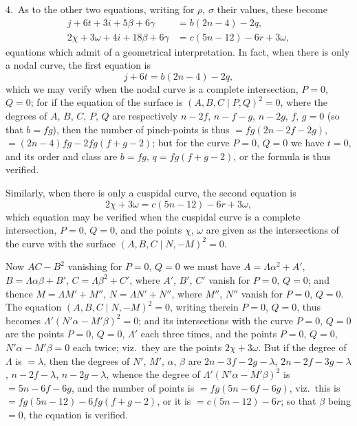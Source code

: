 \documentclass[11pt,a4paper]{article}
\theoremstyle{plain}
\theoremstyle{definition}
\theoremstyle{remark}
\begin{document}
\smallskip

4.\ As to the other two equations, writing for $\rho$, $\sigma$ their values, these become
\begin{align*}
j+6t+3i+5\beta+6\gamma &= b(2n-4)-2q,\\
2\chi+3\omega+4i+18\beta+6\gamma &= c(5n-12)-6r+3\omega,
\end{align*}
equations which admit of a geometrical interpretation. In fact, when there is only a nodal curve, the first equation is
\[
j+6t=b(2n-4)-2q,
\]
which we may verify when the nodal curve is a complete intersection, $P=0$, $Q=0$; for if the equation of the surface is $(A,B,C\mid P,Q)^2=0$, where the degrees of $A$, $B$, $C$, $P$, $Q$ are respectively $n-2f$, $n-f-g$, $n-2g$, $f$, $g=0$ (so that $b=fg$), then the number of pinch-points is thus $=fg(2n-2f-2g)$, $=(2n-4)fg-2fg(f+g-2)$; but for the curve $P=0$, $Q=0$ we have $t=0$, and its order and class are $b=fg$, $q=fg(f+g-2)$, or the formula is thus verified.

Similarly, when there is only a cuspidal curve, the second equation is
\[
2\chi+3\omega=c(5n-12)-6r+3\omega,
\]
which equation may be verified when the cuspidal curve is a complete intersection, $P=0$, $Q=0$, and the points $\chi$, $\omega$ are given as the intersections of the curve with the surface $(A,B,C\mid N,-M)^2=0$.

Now $AC-B^2$ vanishing for $P=0$, $Q=0$ we must have $A=\Lambda\alpha^2+A'$, $B=\Lambda\alpha\beta+B'$, $C=\Lambda\beta^2+C'$, where $A'$, $B'$, $C'$ vanish for $P=0$, $Q=0$; and thence $M=\Lambda M'+M''$, $N=\Lambda N'+N''$, where $M''$, $N''$ vanish for $P=0$, $Q=0$. The equation $(A,B,C\mid N,-M)^2=0$, writing therein $P=0$, $Q=0$, thus becomes $\Lambda'(N'\alpha-M'\beta)^2=0$; and its intersections with the curve $P=0$, $Q=0$ are the points $P=0$, $Q=0$, $\Lambda'$ each three times, and the points $P=0$, $Q=0$, $N'\alpha-M'\beta=0$ each twice; viz.\ they are the points $2\chi+3\omega$. But if the degree of $\Lambda$ is $=\lambda$, then the degrees of $N'$, $M'$, $\alpha$, $\beta$ are $2n-3f-2g-\lambda$, $2n-2f-3g-\lambda$, $n-2f-\lambda$, $n-2g-\lambda$, whence the degree of $\Lambda'(N'\alpha-M'\beta)^2$ is $=5n-6f-6g$, and the number of points is $=fg(5n-6f-6g)$, viz.\ this is $=fg(5n-12)-6fg(f+g-2)$, or it is $=c(5n-12)-6r$; so that $\beta$ being $=0$, the equation is verified.

\newpage
\setcounter{page}{608}
\end{document}
